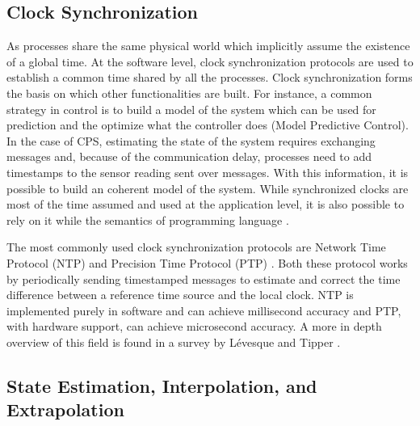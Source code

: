 \documentclass[
graybox,
envcountchap
]{svmult}
\begin{document}
\begin{bibunit}
    \subsection{Clock Synchronization}
    
    As processes share the same physical world which implicitly assume the existence of a global time.
    At the software level, clock synchronization protocols are used to establish a common time shared by all the processes.
    Clock synchronization forms the basis on which other functionalities are built.
    For instance, a common strategy in control is to build a model of the system which can be used for prediction and the optimize what the controller does (Model Predictive Control).
    In the case of CPS, estimating the state of the system requires exchanging messages and, because of the communication delay, processes need to add timestamps to the sensor reading sent over messages.
    With this information, it is possible to build an coherent model of the system.
    While synchronized clocks are most of the time assumed and used at the application level, it is also possible to rely on it while the semantics of programming language \cite{DBLP:conf/dac/LohstrohSGWGSL19,DBLP:conf/emsoft/LohstrohSJWL19}.
    
    The most commonly used clock synchronization protocols are Network Time Protocol (NTP) \cite{rfc5905} and Precision Time Protocol (PTP) \cite{4579760}.
    Both these protocol works by periodically sending timestamped messages to estimate and correct the time difference between a reference time source and the local clock.
    NTP is implemented purely in software and can achieve millisecond accuracy and PTP, with hardware support, can achieve microsecond accuracy.
    A more in depth overview of this field is found in a survey by L\'evesque and Tipper \cite{DBLP:journals/comsur/LevesqueT16}.
  
    \subsection{State Estimation, Interpolation, and Extrapolation}
    

\end{bibunit}
\end{document}
